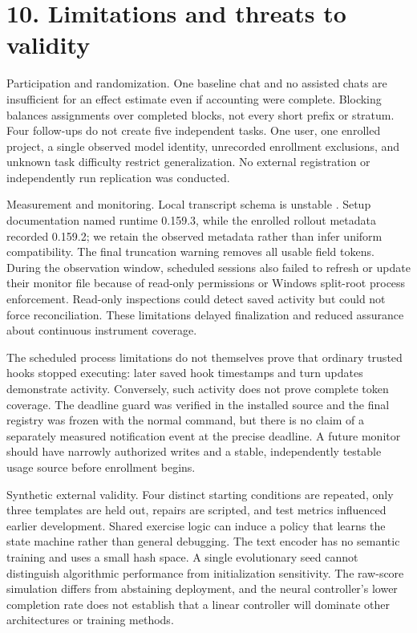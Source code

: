 \documentclass[11pt]{article}
\begin{document}
\section*{10. Limitations and threats to validity}
Participation and randomization. One baseline chat and no assisted chats are insufficient for an effect estimate even if accounting were complete. Blocking balances assignments over completed blocks, not every short prefix or stratum. Four follow-ups do not create five independent tasks. One user, one enrolled project, a single observed model identity, unrecorded enrollment exclusions, and unknown task difficulty restrict generalization. No external registration or independently run replication was conducted.

Measurement and monitoring. Local transcript schema is unstable \cite{r7}. Setup documentation named runtime 0.159.3, while the enrolled rollout metadata recorded 0.159.2; we retain the observed metadata rather than infer uniform compatibility. The final truncation warning removes all usable field tokens. During the observation window, scheduled sessions also failed to refresh or update their monitor file because of read-only permissions or Windows split-root process enforcement. Read-only inspections could detect saved activity but could not force reconciliation. These limitations delayed finalization and reduced assurance about continuous instrument coverage.

The scheduled process limitations do not themselves prove that ordinary trusted hooks stopped executing: later saved hook timestamps and turn updates demonstrate activity. Conversely, such activity does not prove complete token coverage. The deadline guard was verified in the installed source and the final registry was frozen with the normal command, but there is no claim of a separately measured notification event at the precise deadline. A future monitor should have narrowly authorized writes and a stable, independently testable usage source before enrollment begins.

Synthetic external validity. Four distinct starting conditions are repeated, only three templates are held out, repairs are scripted, and test metrics influenced earlier development. Shared exercise logic can induce a policy that learns the state machine rather than general debugging. The text encoder has no semantic training and uses a small hash space. A single evolutionary seed cannot distinguish algorithmic performance from initialization sensitivity. The raw-score simulation differs from abstaining deployment, and the neural controller's lower completion rate does not establish that a linear controller will dominate other architectures or training methods.
\end{document}
